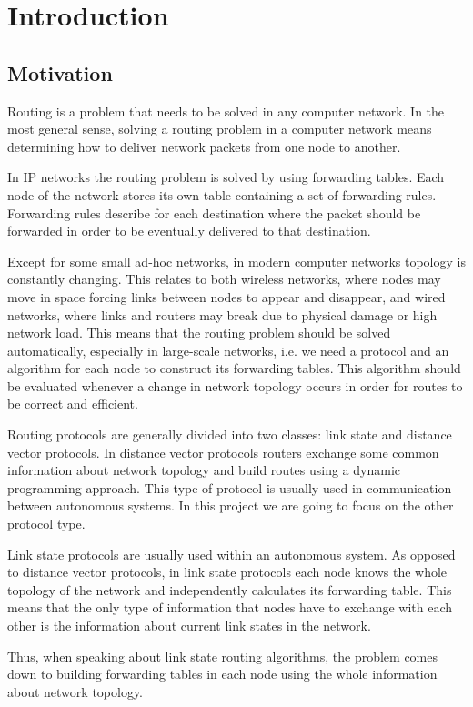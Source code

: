 \section{Introduction}

\subsection{Motivation}
Routing is a problem that needs to be solved in any computer network. In the most general sense, solving a routing problem in a computer network means determining how to deliver network packets from one node to another.

In IP networks the routing problem is solved by using forwarding tables. Each node of the network stores its own table containing a set of forwarding rules. Forwarding rules describe for each destination where the packet should be forwarded in order to be eventually delivered to that destination.

Except for some small ad-hoc networks, in modern computer networks topology is constantly changing. This relates to both wireless networks, where nodes may move in space forcing links between nodes to appear and disappear, and wired networks, where links and routers may break due to physical damage or high network load. This means that the routing problem should be solved automatically, especially in large-scale networks, i.e. we need a protocol and an algorithm for each node to construct its forwarding tables. This algorithm should be evaluated whenever a change in network topology occurs in order for routes to be correct and efficient.

Routing protocols are generally divided into two classes: link state and distance vector protocols. In distance vector protocols routers exchange some common information about network topology and build routes using a dynamic programming approach. This type of protocol is usually used in communication between autonomous systems. In this project we are going to focus on the other protocol type.

Link state protocols are usually used within an autonomous system. As opposed to distance vector protocols, in link state protocols each node knows the whole topology of the network and independently calculates its forwarding table. This means that the only type of information that nodes have to exchange with each other is the information about current link states in the network.

Thus, when speaking about link state routing algorithms, the problem comes down to building forwarding tables in each node using the whole information about network topology.

